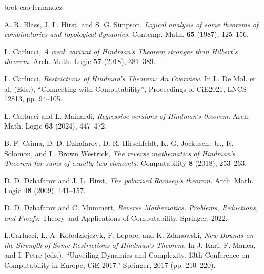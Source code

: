 \documentclass[10pt,a4paper]{amsart}
\theoremstyle{definition}
\begin{document}
\begin{thebibliography}{brot-cao-fernandez}

A. R. Blass, J. L. Hirst, and S. G. Simpson,
{\em Logical analysis of some theorems of combinatorics and topological dynamics.}
Contemp. Math.
{\bf 65} (1987), 125--156.

L. Carlucci,
{\em A weak variant of Hindman's Theorem stronger than Hilbert's theorem.}
Arch. Math. Logic
{\bf 57} (2018), 381--389.

L. Carlucci,
{\em Restrictions of Hindman's Theorem: An Overview.}
In L. De Mol. et al. (Eds.),
``Connecting with Computability'', Proceedings of CiE2021,
LNCS 12813, pp. 94--105.

L. Carlucci and L. Mainardi,
{\em Regressive versions of Hindman's theorem.}
Arch. Math. Logic
{\bf 63} (2024), 447--472.

B. F. Csima, D. D. Dzhafarov, D. R. Hirschfeldt, K. G. Jockusch, Jr., R. Solomon, and L. Brown Westrick,
{\em The reverse mathematics of Hindman's Theorem for sums of exactly two elements.}
Computability
{\bf 8} (2018), 253--263.

D. D. Dzhafarov and J. L. Hirst,
{\em The polarized Ramsey's theorem.}
Arch. Math. Logic
{\bf 48} (2009), 141--157.


D. D. Dzhafarov and C. Mummert,
{\em Reverse Mathematics. Problems, Reductions, and Proofs.}
Theory and Applications of Computability,
Springer, 2022.


L.Carlucci, L. A. Ko\l{}odziejczyk, F. Lepore, and K. Zdanowski,
{\em New Bounds on the Strength of Some Restrictions of Hindman’s Theorem.}
In J. Kari, F. Manea, and I. Petre (eds.), ``Unveiling Dynamics and Complexity. 13th Conference on Computability in Europe, CiE 2017.''
Springer, 2017 (pp. 210--220).


\end{thebibliography}
\end{document}
